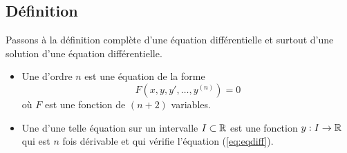 \documentclass[class=report,crop=false]{standalone}
\begin{document}
\subsection{Définition}

Passons à la définition complète d'une équation différentielle
et surtout d'une solution d'une équation différentielle.

\begin{definition}
\sauteligne
\begin{itemize}
  \item Une  d'ordre $n$ est une équation de la forme
  \begin{equation}
    F\left(x,y,y',\dots ,y^{(n)}\right)=0
    \label{eq:eqdiff}
    \tag{$E$}
  \end{equation}
  où $F$ est une fonction de $(n+2)$ variables.

  \item Une  d'une telle équation sur un intervalle $I\subset \mathbb{R}$
  est une fonction $y :I \to \mathbb{R}$ qui est $n$ fois dérivable
  et qui vérifie l'équation (\ref{eq:eqdiff}).
\end{itemize}
\end{definition}
\end{document}
